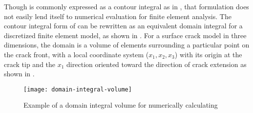 Though \J is commonly expressed as a contour integral as in , that formulation does not easily lend itself to numerical evaluation for finite element analysis.
The contour integral form of \J can be rewritten as an equivalent domain integral for a discretized finite element model, as shown in \cite{anderson2005,warp3d,doddsvargas1988}.
For a surface crack model in three dimensions, the domain is a volume of elements surrounding a particular point on the crack front, with a local coordinate system (\(x_1, x_2, x_3\)) with its origin at the crack tip and the \(x_1\) direction oriented toward the direction of crack extension as shown in .
\begin{figure}[tbp]
\centering
\texttt{[image: domain-integral-volume]}
\caption[Example of a domain integral volume for numerically calculating \J]{\label{fig:domain-integral-volume} Example of a domain integral volume for numerically calculating \J \citep{warp3d}}
\end{figure}


